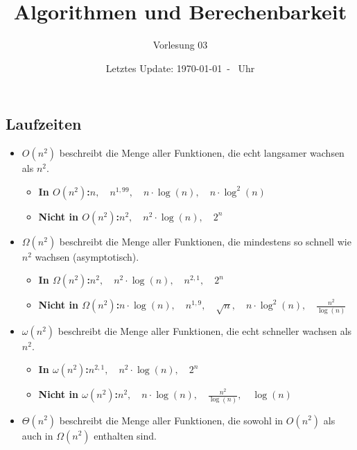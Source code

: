 \documentclass{scrartcl}%
\begin{document}
    \subject{Vorlesungsmitschrieb}
    \title{Algorithmen und Berechenbarkeit}
    \subtitle{Vorlesung 03}
    \date{Letztes Update: \today \ - \currenttime \ Uhr}
    \maketitle

    \subsection*{Laufzeiten}
    \label{subsec:laufzeiten}

    \begin{itemize}
        \item $O(n^2)$ beschreibt die Menge aller Funktionen, die echt langsamer wachsen als $n^2$.
        \begin{itemize}
            \item \textbf{In $O(n^2)$:}\quad $n,\quad n^{1,99},\quad n \cdot \log(n),\quad n \cdot \log^2(n)$
            \item \textbf{Nicht in $O(n^2)$:}\quad $n^2,\quad n^2 \cdot \log(n),\quad 2^n$
        \end{itemize}
        \item $\Omega(n^2)$ beschreibt die Menge aller Funktionen, die mindestens so schnell wie $n^2$ wachsen (asymptotisch).
        \begin{itemize}
            \item \textbf{In $\Omega(n^2)$:}\quad $n^2,\quad n^2 \cdot \log(n),\quad n^{2,1},\quad 2^n$
            \item \textbf{Nicht in $\Omega(n^2)$:}\quad $n \cdot \log(n),\quad n^{1,9},\quad \sqrt{n},\quad n \cdot \log^2(n),\quad \frac{n^2}{\log(n)}$
        \end{itemize}
        \item $\omega(n^2)$ beschreibt die Menge aller Funktionen, die echt schneller wachsen als $n^2$.
        \begin{itemize}
            \item \textbf{In $\omega(n^2)$:}\quad $n^{2,1},\quad n^2 \cdot \log(n), \quad 2^n$
            \item \textbf{Nicht in $\omega(n^2)$:}\quad $n^2, \quad n \cdot \log(n), \quad \frac{n^2}{\log(n)}, \quad \log(n)$
        \end{itemize}
        \item $\Theta(n^2)$ beschreibt die Menge aller Funktionen, die sowohl in $O(n^2)$ als auch in $\Omega(n^2)$ enthalten sind.
    \end{itemize}
\end{document}

